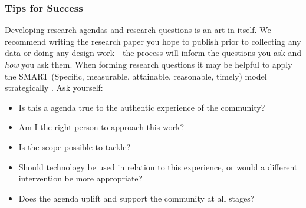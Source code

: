 \subsubsection{Tips for Success}
Developing research agendas and research questions is an art in itself. We recommend writing the research paper you hope to publish prior to collecting any data or doing any design work—the process will inform the questions you ask and \textit{how} you ask them. When forming research questions it may be helpful to apply the SMART (Specific, measurable, attainable, reasonable, timely) model strategically \cite{fieldingTargetSettingPolicy1999}. Ask yourself:
\begin{itemize}
\item Is this a agenda true to the authentic experience of the community?
\item Am I the right person to approach this work? 
\item Is the scope possible to tackle?
\item Should technology be used in relation to this experience, or would a different intervention be more appropriate?
\item Does the agenda uplift and support the community at all stages?
\end{itemize}


